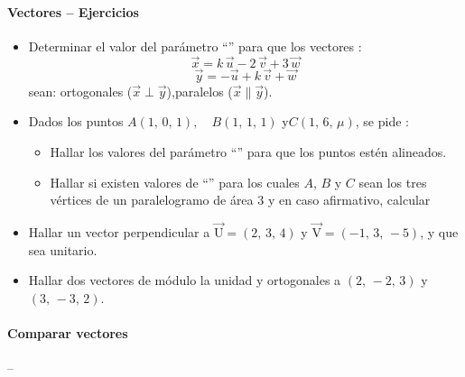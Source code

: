 \documentclass[12pt, twocolumn, landscape, a4paper]{article}
\begin{document}
\paragraph*{Vectores -- Ejercicios}

\begin{itemize}
\item{Determinar el valor del parámetro ``'' para que los vectores :
$$
\vec{x} = k\,\vec{u} - 2\,\vec{v} + 3\,\vec{w}
$$
$$
\vec{y} = - \vec{u} + k\,\vec{v} + \vec{w}
$$
sean: ortogonales ($\vec{x}\perp\vec{y}$),\qquad paralelos ($\vec{x}\parallel\vec{y}$).
}
\item{Dados los puntos $A(1,\,0,\,1),\quad B(1,\,1,\,1)$ y\quad $C(1,\,6,\,\mu)$, se pide :
\begin{itemize}
\item{Hallar los valores del parámetro ``\scalebox{1.1}{$\mu$}'' para que los puntos estén alineados.}
\item{Hallar si existen valores de ``\scalebox{1.1}{$\mu$}'' para los cuales $A$, $B$ y $C$ sean los tres vértices de un paralelogramo de área 3 y en caso afirmativo, calcular}
\end{itemize}
}
\item{Hallar un vector perpendicular a $\overrightarrow{\text{U}} = (2,\,3,\,4)$ y $\vec{\text{V}} =(-1,\,3,\,-5)$, y que sea unitario.}
\item{Hallar dos vectores de módulo la unidad y ortogonales a $(2,\,-2,\,3)$ y $(3,\,-3,\,2)$.}
\end{itemize}

\paragraph*{Comparar vectores} -- \\
\end{document}
